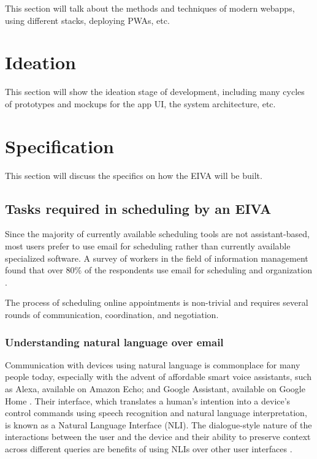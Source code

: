 \documentclass{article}
\begin{document}
This section will talk about the methods and techniques of modern webapps, using different stacks, deploying PWAs, etc.

\newpage

\section{Ideation}

This section will show the ideation stage of development, including many cycles of prototypes and mockups for the app UI, the system architecture, etc.

\newpage

\section{Specification}

This section will discuss the specifics on how the EIVA will be built.

\subsection{Tasks required in scheduling by an EIVA}

Since the majority of currently available scheduling tools are not assistant-based, most users prefer to use email for scheduling rather than currently available specialized software. A survey of workers in the field of information management found that over 80\% of the respondents use email for scheduling and organization \cite{ducheneaut_e-mail_2001}.

The process of scheduling online appointments is non-trivial and requires several rounds of communication, coordination, and negotiation.

\subsubsection{Understanding natural language over email}

Communication with devices using natural language is commonplace for many people today, especially with the advent of affordable smart voice assistants, such as Alexa, available on Amazon Echo; and Google Assistant, available on Google Home \cite{de_barcelos_silva_intelligent_2020}. Their interface, which translates a human's intention into a device's control commands using speech recognition and natural language interpretation, is known as a Natural Language Interface (NLI). The dialogue-style nature of the interactions between the user and the device and their ability to preserve context across different queries are benefits of using NLIs over other user interfaces \cite{kiseleva_predicting_2016}.
\end{document}
